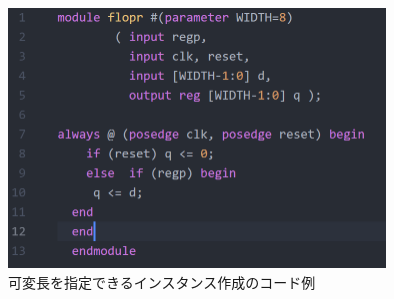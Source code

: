 \documentclass[a4paper,11pt,oneside,openany]{jsarticle}
\begin{document}
\begin{figure}[h]
  \centering
  \includegraphics[width=10cm]{floprcode.png}
  \caption{可変長を指定できるインスタンス作成のコード例}
  \label{flopr}
\end{figure}

\newpage
\end{document}
